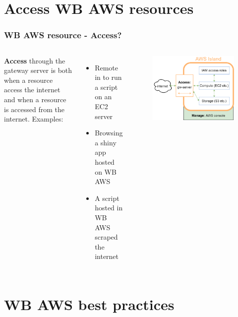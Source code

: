 \documentclass[aspectratio=169]{beamer} %
\begin{document}
\section{Access WB AWS resources}

\begin{frame}
	\frametitle{WB AWS resource - Access?}
	\begin{columns}[c]
		\textbf{Access} through the gateway server is both when a resource access the internet and when a resource is accessed from the internet. 
		\vspace{.5cm}\newline
		Examples:
		\begin{itemize}
			\item Remote in to run a script on an EC2 server
			\item Browsing a shiny app hosted on WB AWS
			\item A script hosted in WB AWS scraped the internet
		\end{itemize}
		
		\begin{figure}
			\centering
			\includegraphics[width=\textwidth]{./img/wb-aws.png}
		\end{figure}
		
	\end{columns}
\end{frame}


\section{WB AWS best practices}
\end{document}
